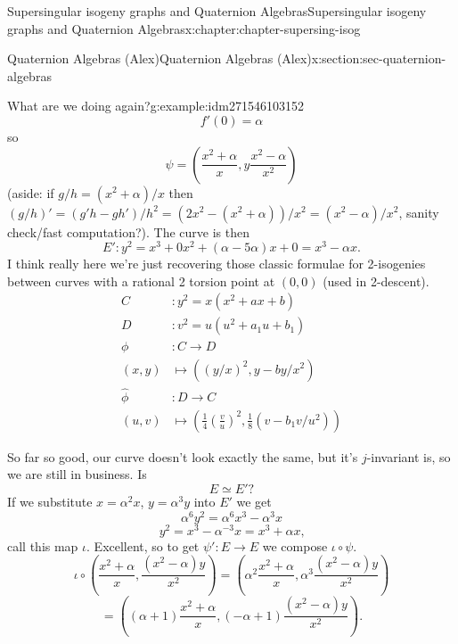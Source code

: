 \documentclass[oneside,10pt,]{book}
\numberwithin{equation}{section}
\newcommand{\amp}{&}
\begin{document}
\begin{chapterptx}{Supersingular isogeny graphs and Quaternion Algebras}{}{Supersingular isogeny graphs and Quaternion Algebras}{}{}{x:chapter:chapter-supersing-isog}
\begin{sectionptx}{Quaternion Algebras (Alex)}{}{Quaternion Algebras (Alex)}{}{}{x:section:sec-quaternion-algebras}
\begin{introduction}{}
\begin{example}{What are we doing again?}{g:example:idm271546103152}
\begin{equation*}
f'(0) = \alpha
\end{equation*}
so%
\begin{equation*}
\psi= \left(\frac{x^2 + \alpha}{x}, y\frac{x^2 - \alpha}{x^2} \right)
\end{equation*}
(aside: if \(g/h = (x^2+\alpha)/x\) then \((g/h)' = (g' h - g h')/h^2 = (2x^2 - (x^2 + \alpha))/x^2 = (x^2 - \alpha)/x^2\), sanity check\slash{}fast computation?). The curve is then%
\begin{equation*}
E'\colon y^2 = x^3 + 0x^2 + (\alpha - 5\alpha)x +0 = x^3  - \alpha x\text{.}
\end{equation*}
I think really here we're just recovering those classic formulae for 2-isogenies between curves with a rational 2 torsion point at \((0,0)\) (used in 2-descent).%
\begin{align*}
C\amp\colon y^2 = x(x^2+ax+b)\\
D\amp\colon v^2 = u(u^2+a_1u+b_1)\\
\phi\amp\colon C\to D\\
(x,y) \amp\mapsto ((y/x)^2 , y-by/x^2)\\
\hat\phi\amp\colon D\to C\\
(u,v) \amp\mapsto \left(\frac14\left(\frac vu\right)^2 ,\frac18( v-b_1 v/u^2)\right)
\end{align*}
%
\par
So far so good, our curve doesn't look exactly the same, but it's \(j\)-invariant is, so we are still in business. Is%
\begin{equation*}
E \simeq E'\text{?}
\end{equation*}
If we substitute \(x= \alpha^2 x\), \(y = \alpha ^3 y\) into \(E'\) we get%
\begin{equation*}
\alpha^6 y^2 = \alpha^6 x^3 - \alpha^3 x
\end{equation*}
%
\begin{equation*}
y^2 = x^3 - \alpha^{-3} x = x^3 +\alpha x\text{,}
\end{equation*}
call this map \(\iota\). Excellent, so to get \(\psi' \colon E\to E\) we compose \(\iota\circ \psi\).%
\begin{equation*}
\iota \circ\left( \frac{x^2  + \alpha}{x}, \frac{(x^2 - \alpha )y}{x^2}\right)  = \left( \alpha^2\frac{x^2  + \alpha}{x}, \alpha^3\frac{(x^2 - \alpha )y}{x^2}\right)
\end{equation*}
%
\begin{equation*}
= \left( (\alpha+  1)\frac{x^2  + \alpha}{x}, ( -\alpha  + 1)\frac{(x^2 - \alpha )y}{x^2}\right)\text{.}
\end{equation*}

\end{example}
\end{introduction}
\end{sectionptx}
\end{chapterptx}
\end{document}
